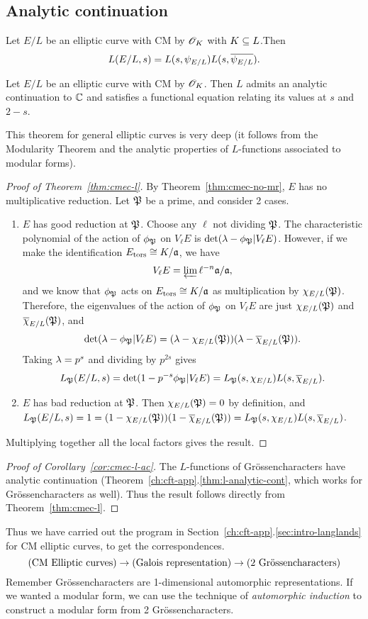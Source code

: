 \subsection{Analytic continuation}
\begin{thm}[Deuring]
Let $E/L$ be an elliptic curve with CM by $\mathscr{O}_K$ with $K\subseteq L$.Then
\[
L(E/L,s)=L(s,\psi_{E/L})L(s,\overline{\psi_{E/L}}).
\]
\end{thm}
\begin{cor}
Let $E/L$ be an elliptic curve with CM by $\mathscr{O}_K$. Then $L$ admits an analytic continuation to $\mathbb{C}$ and satisfies a functional equation relating its values at $s$ and $2-s$.
\end{cor}
This theorem for general elliptic curves is very deep (it follows from the Modularity Theorem and the analytic properties of $L$-functions associated to modular forms).
\begin{proof}[Proof of Theorem~\ref{thm:cmec-l}]
By Theorem~\ref{thm:cmec-no-mr}, $E$ has no multiplicative reduction. Let $\mathfrak{P}$ be a prime, and consider 2 cases.
\begin{enumerate}
\item
$E$ has good reduction at $\mathfrak{P}$. Choose any $\ell$ not dividing $\mathfrak{P}$. The characteristic polynomial of the action of $\phi_{\mathfrak{P}}$ on $V_{\ell}E$ is 
$\det(\lambda- \phi_{\mathfrak{P}}|V_{\ell}E)$. However, if we make the identification $E_{\text{tors}}\cong K/\mathfrak{a}$, we have
\[
V_{\ell}E=\varprojlim \ell^{-n}\mathfrak{a}/\mathfrak{a},
\]
and we know that $\phi_{\mathfrak{P}}$ acts on $E_{\text{tors}}\cong K/\mathfrak{a}$ as multiplication by $\chi_{E/L}(\mathfrak{P})$. Therefore, the eigenvalues of the action of $\phi_{\mathfrak{P}}$ on $V_{\ell}E$ are just $\chi_{E/L}(\mathfrak{P})$ and $\overline{\chi}_{E/L}(\mathfrak{P})$, and 
\[
\det(\lambda- \phi_{\mathfrak{P}}|V_{\ell}E)=(\lambda-\chi_{E/L}(\mathfrak{P}))(\lambda-\overline{\chi}_{E/L}(\mathfrak{P})).
\]
Taking $\lambda=p^{s}$ and dividing by $p^{2s}$ gives
\[
L_{\mathfrak{P}}(E/L,s)=\det(1- p^{-s}\phi_{\mathfrak{P}}|V_{\ell}E)
=L_{\mathfrak{P}}(s,\chi_{E/L})L(s,\overline{\chi}_{E/L}).
\]
\item
$E$ has bad reduction at $\mathfrak{P}$. Then $\chi_{E/L}(\mathfrak{P})=0$ by definition, and $L_{\mathfrak{P}}(E/L,s)=1=(1-\chi_{E/L}(\mathfrak{P}))(1-\overline{\chi}_{E/L}(\mathfrak{P}))=L_{\mathfrak{P}}(s,\chi_{E/L})L(s,\overline{\chi}_{E/L})$.
\end{enumerate}
Multiplying together all the local factors gives the result.
\end{proof}
\begin{proof}[Proof of Corollary~\ref{cor:cmec-l-ac}]
The $L$-functions of Gr\"ossencharacters have analytic continuation (Theorem~\ref{ch:cft-app}.\ref{thm:l-analytic-cont}, which works for Gr\"ossencharacters as well). Thus the result follows directly from Theorem~\ref{thm:cmec-l}.
\end{proof}
Thus we have carried out the program in Section~\ref{ch:cft-app}.\ref{sec:intro-langlands} for CM elliptic curves, to get the correspondences.
\[
\text{(CM Elliptic curves)}\rightarrow \text{(Galois representation)}
\rightarrow \text{(2 Gr\"ossencharacters)}\\
\]
Remember Gr\"ossencharacters are 1-dimensional automorphic representations. If we wanted a modular form, we can use the technique of {\it automorphic induction} to construct a modular form from 2 Gr\"ossencharacters.